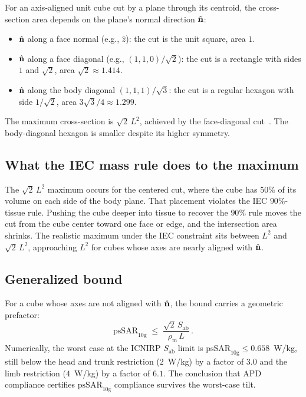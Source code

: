 \documentclass[11pt,a4paper]{article}
\theoremstyle{definition}
\theoremstyle{remark}
\newcommand{\APD}{S_{\mathrm{ab}}}
\newcommand{\nhat}{\hat{\vb{n}}}
\newcommand{\psSAR}{\ensuremath{\mathrm{psSAR}_{10\mathrm{g}}}}
\newcommand{\rhom}{\rho_{\mathrm{m}}}
\begin{document}
For an axis-aligned unit cube cut by a plane through its centroid, the
cross-section area depends on the plane's normal direction $\nhat$:
\begin{itemize}\setlength{\itemsep}{2pt}
  \item $\nhat$ along a face normal (e.g., $\hat{z}$): the cut is the
        unit square, area $1$.
  \item $\nhat$ along a face diagonal (e.g., $(1,1,0)/\sqrt{2}$): the
        cut is a rectangle with sides $1$ and $\sqrt{2}$, area
        $\sqrt{2} \approx 1.414$.
  \item $\nhat$ along the body diagonal $(1,1,1)/\sqrt{3}$: the cut is
        a regular hexagon with side $1/\sqrt{2}$, area
        $3\sqrt{3}/4 \approx 1.299$.
\end{itemize}
The maximum cross-section is $\sqrt{2}\,L^2$, achieved by the
face-diagonal cut~\cite{KuhnelMath}. The body-diagonal hexagon is
smaller despite its higher symmetry.

\subsection{What the IEC mass rule does to the maximum}

The $\sqrt{2}\,L^2$ maximum occurs for the centered cut, where the
cube has $50\%$ of its volume on each side of the body plane. That
placement violates the IEC $90\%$-tissue rule. Pushing the cube deeper
into tissue to recover the $90\%$ rule moves the cut from the cube
center toward one face or edge, and the intersection area shrinks.
The realistic maximum under the IEC constraint sits between $L^2$ and
$\sqrt{2}\,L^2$, approaching $L^2$ for cubes whose axes are nearly
aligned with $\nhat$.

\subsection{Generalized bound}

For a cube whose axes are not aligned with $\nhat$, the bound carries a
geometric prefactor:
\begin{equation}\label{eq:apd-dom-gen}
  \psSAR \;\le\; \frac{\sqrt{2}\,\APD}{\rhom\,L}\, .
\end{equation}
Numerically, the worst case at the ICNIRP $\APD$ limit is
$\psSAR \le 0.658$~W/kg, still below the head and trunk restriction
($2$~W/kg) by a factor of $3.0$ and the limb restriction ($4$~W/kg) by
a factor of $6.1$. The conclusion that APD compliance certifies
$\psSAR$ compliance survives the worst-case tilt.
\end{document}
